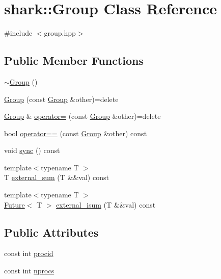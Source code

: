 \hypertarget{classshark_1_1_group}{}\section{shark\+:\+:Group Class Reference}
\label{classshark_1_1_group}


{\ttfamily \#include $<$group.\+hpp$>$}

\subsection*{Public Member Functions}
\begin{DoxyCompactItemize}
\item 
\hyperlink{classshark_1_1_group_aed00a22ff227ee2657ae44a5cbcedf7c}{$\sim$\+Group} ()
\item 
\hyperlink{classshark_1_1_group_aeee7d7330ef0f51e426e93978b3376b3}{Group} (const \hyperlink{classshark_1_1_group}{Group} \&other)=delete
\item 
\hyperlink{classshark_1_1_group}{Group} \& \hyperlink{classshark_1_1_group_a6e7729794a54c2046bd939663f601865}{operator=} (const \hyperlink{classshark_1_1_group}{Group} \&other)=delete
\item 
bool \hyperlink{classshark_1_1_group_ae51d304a99a430333c2b910f55757c60}{operator==} (const \hyperlink{classshark_1_1_group}{Group} \&other) const
\item 
void \hyperlink{classshark_1_1_group_a73a616469f03e775f8203e86690fbe7e}{sync} () const
\item 
{\footnotesize template$<$typename T $>$ }\\T \hyperlink{classshark_1_1_group_ac254938f11bae1e1cda77072468f9bc1}{external\+\_\+sum} (T \&\&val) const
\item 
{\footnotesize template$<$typename T $>$ }\\\hyperlink{structshark_1_1_future}{Future}$<$ T $>$ \hyperlink{classshark_1_1_group_a45c07b72e75f90b39e550e80d7ea2418}{external\+\_\+isum} (T \&\&val) const
\end{DoxyCompactItemize}
\subsection*{Public Attributes}
\begin{DoxyCompactItemize}
\item 
const int \hyperlink{classshark_1_1_group_af8c22a10243c3d05301280119b72c073}{procid}
\item 
const int \hyperlink{classshark_1_1_group_a90e041a7fa6c40c924b17f8c2006e6b2}{nprocs}
\end{DoxyCompactItemize}
